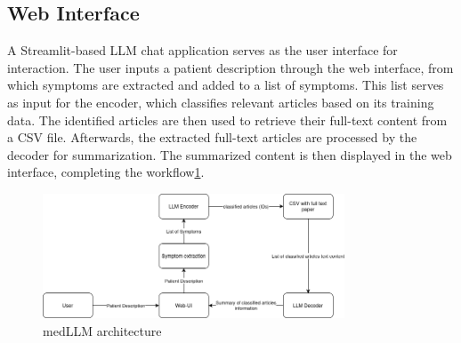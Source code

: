 \subsection{Web Interface}
A Streamlit-based LLM chat application serves as the user interface for interaction. The user inputs a patient description through the web interface, from which symptoms are extracted and added to a list of symptoms. This list serves as input for the encoder, which classifies relevant articles based on its training data. The identified articles are then used to retrieve their full-text content from a CSV file. Afterwards, the extracted full-text articles are processed by the decoder for summarization. The summarized content is then displayed in the web interface, completing the workflow\ref{fig:architecture}.

\begin{figure}
    \centering
    \includegraphics[width=0.8\textwidth]{fig/bkim_architecture.png}
    \caption{medLLM architecture}
    \label{fig:architecture}
\end{figure}

